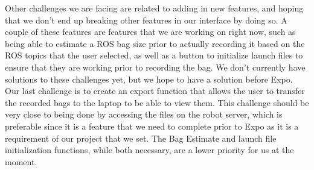 \documentclass[onecolumn, draftclsnofoot,10pt, compsoc]{IEEEtran}
\begin{document}
Other challenges we are facing are related to adding in new features, and hoping that we don't end up breaking other features in our interface by doing so. A couple of these features are features that we are working on right now, such as being able to estimate a ROS bag size prior to actually recording it based on the ROS topics that the user selected, as well as a button to initialize launch files to ensure that they are working prior to recording the bag. We don't currently have solutions to these challenges yet, but we hope to have a solution before Expo. Our last challenge is to create an export function that allows the user to transfer the recorded bags to the laptop to be able to view them. This challenge should be very close to being done by accessing the files on the robot server, which is preferable since it is a feature that we need to complete prior to Expo as it is a requirement of our project that we set. The Bag Estimate and launch file initialization functions, while both necessary, are a lower priority for us at the moment.
\end{document}
